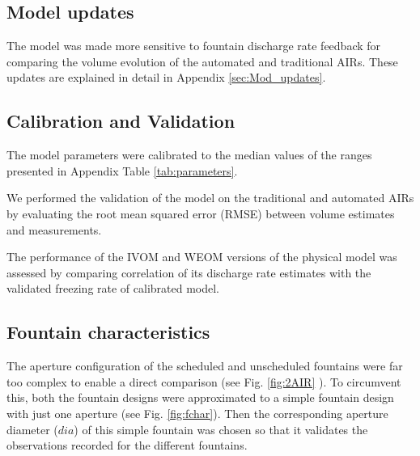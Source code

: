\documentclass[tc, manuscript]{copernicus}
\begin{document}
\subsection{Model updates}
The model was made more sensitive to fountain discharge rate feedback for comparing the volume evolution of the
automated and traditional AIRs. These updates are explained in detail in Appendix \ref{sec:Mod_updates}.

\subsection{Calibration and Validation}

The model parameters were calibrated to the median values of the ranges presented in Appendix Table \ref{tab:parameters}.

We performed the validation of the model on the traditional and automated AIRs by evaluating the root mean
squared error (RMSE) between volume estimates and measurements. 

The performance of the IVOM and WEOM versions of the physical model was assessed by comparing correlation of its
discharge rate estimates with the validated freezing rate of calibrated model.

\subsection{Fountain characteristics}

The aperture configuration of the scheduled and unscheduled fountains were far too complex to enable a direct
comparison (see Fig. \ref{fig:2AIR} ). To circumvent this, both the fountain designs were approximated to a
simple fountain design with just one aperture (see Fig. \ref{fig:fchar}). Then the corresponding aperture
diameter ($dia$) of this simple fountain was chosen so that it validates the observations recorded for the
different fountains.  
\end{document}
